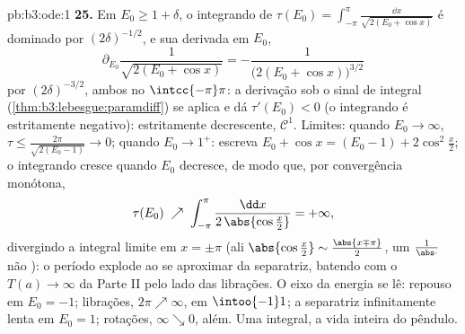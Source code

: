 \begin{solution}{pb:b3:ode:1}
\textbf{25.} Em $E_0 \geq 1 + \delta$, o integrando de
$\tau(E_0) = \int_{-\pi}^{\pi}\frac{\dd x}{\sqrt{2(E_0 +
\cos x)}}$ é dominado por $(2\delta)^{-1/2}$, e sua
derivada em $E_0$,
\[
\partial_{E_0}\frac1{\sqrt{2(E_0 + \cos x)}}
= -\frac{1}{\bigl(2(E_0 + \cos x)\bigr)^{3/2}}
\]
por $(2\delta)^{-3/2}$, ambos  no 
$\intcc{-\pi}\pi$: a derivação sob o sinal de integral
(\cref{thm:b3:lebesgue:paramdiff}) se aplica e dá
$\tau'(E_0) < 0$ (o integrando é estritamente negativo):
estritamente decrescente, $\mathcal C^1$. Limites: quando $E_0 \to
\infty$, $\tau \leq \frac{2\pi}{\sqrt{2(E_0 - 1)}} \to 0$;
quando $E_0 \to 1^+$: escreva $E_0 + \cos x = (E_0 - 1) +
2\cos^2\frac x2$; o integrando cresce quando $E_0$
decresce, de modo que, por convergência monótona,
\[
\tau(E_0) \;\nearrow\;
\int_{-\pi}^{\pi}\frac{\dd x}{2\,\abs{\cos\frac x2}}
= +\infty,
\]
divergindo a integral limite em $x = \pm\pi$ (ali
$\abs{\cos\frac x2} \sim \frac{\abs{x \mp \pi}}2$, um
$\frac1{\abs\cdot}$ não ): o período explode
ao se aproximar da separatriz, batendo com o $T(a) \to
\infty$ da Parte II pelo lado das librações. O eixo
da energia se lê: repouso em $E_0 = -1$; librações, $2\pi \nearrow
\infty$, em $\intoo{-1}1$; a separatriz infinitamente lenta em
$E_0 = 1$; rotações, $\infty \searrow 0$, além. Uma
integral, a vida inteira do pêndulo.
\end{solution}
